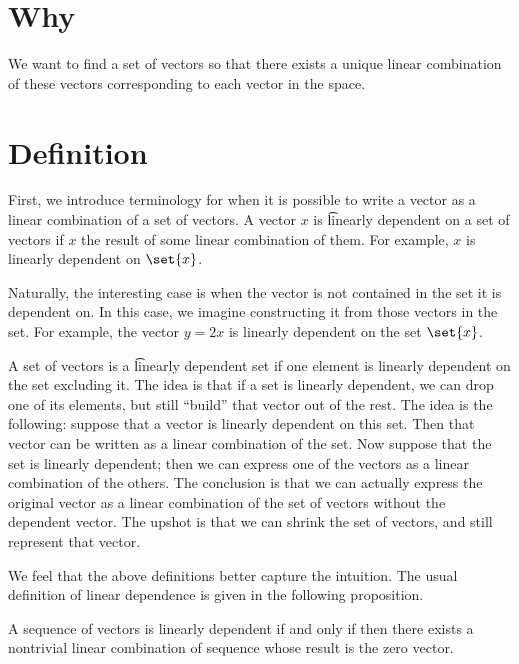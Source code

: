 

\section*{Why}

We want to find a set of vectors so that there exists a unique linear combination of these vectors corresponding to each vector in the space.

\section*{Definition}

First, we introduce terminology for when it is possible to write a vector as a linear combination of a set of vectors.
A vector $x$ is \t{linearly dependent on a set of vectors} if $x$ the result of some linear combination of them.
For example, $x$ is linearly dependent on $\set{x}$.


Naturally, the interesting case is when the vector is not contained in the set it is dependent on.
In this case, we imagine constructing it from those vectors in the set.
For example, the vector $y = 2x$ is linearly dependent on the set $\set{x}$.

A set of vectors is a \t{linearly dependent set} if one element is linearly dependent on the set excluding it.
The idea is that if a set is linearly dependent, we can drop one of its elements, but still ``build'' that vector out of the rest.
The idea is the following: suppose that a vector is linearly dependent on this set.
Then that vector can be written as a linear combination of the set.
Now suppose that the set is linearly dependent; then we can express one of the vectors as a linear combination of the others.
The conclusion is that we can actually express the original vector as a linear combination of the set of vectors without the dependent vector.
The upshot is that we can shrink the set of vectors, and still represent that vector.

We feel that the above definitions better capture the intuition.
The usual definition of linear dependence is given in the following proposition.
\begin{proposition}
A sequence of vectors is linearly dependent if and only if then there exists a nontrivial linear combination of sequence whose result is the zero vector.
\end{proposition}


